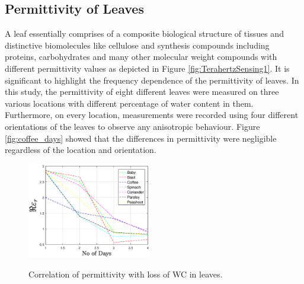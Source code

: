 \documentclass[journal,article,submit,moreauthors,pdftex]{Definitions/mdpi}
\renewcommand{\^}{\hat}  %
\begin{document}
\subsection{Permittivity of Leaves}
%
A leaf essentially comprises of a composite biological structure of tissues and distinctive biomolecules like cellulose and synthesis compounds including proteins, carbohydrates and many other molecular weight compounds with different permittivity values \cite{Gente} as depicted in Figure \ref{fig:TerahertzSensing1}. It is significant to highlight the frequency dependence of the permittivity of leaves. In this study, the permittivity of eight different leaves were measured on three various locations with different percentage of water content in them. Furthermore, on every location, measurements were recorded using four different orientations of the leaves to observe any anisotropic behaviour. Figure  \ref{fig:coffee_days} showed that the differences in permittivity were negligible regardless of the location and orientation.\\


\begin{figure}[t!]
	\centering
	{\includegraphics[width=0.48\textwidth]{permittivity_water.eps}}
	\caption{Correlation of permittivity with loss of WC in leaves.}
	\label{fig:correlation_perm}
\end{figure}
\end{document}
